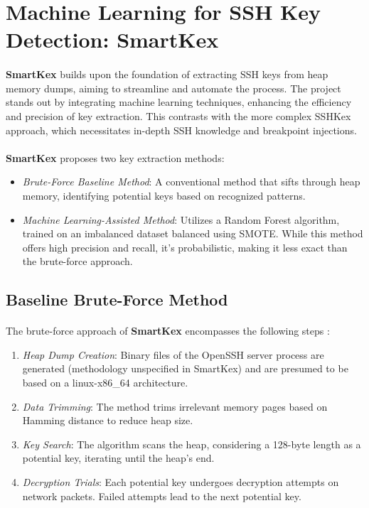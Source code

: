\section{Machine Learning for SSH Key Detection: SmartKex}

    \paragraph{}\textbf{SmartKex} builds upon the foundation of extracting SSH keys from heap memory dumps, aiming to streamline and automate the process. The project stands out by integrating machine learning techniques, enhancing the efficiency and precision of key extraction. This contrasts with the more complex SSHKex approach, which necessitates in-depth SSH knowledge and breakpoint injections.

    \paragraph{}\textbf{SmartKex} proposes two key extraction methods:
    \begin{itemize}
        \item \textit{Brute-Force Baseline Method}: A conventional method that sifts through heap memory, identifying potential keys based on recognized patterns.
        \item \textit{Machine Learning-Assisted Method}: Utilizes a Random Forest algorithm, trained on an imbalanced dataset balanced using SMOTE. While this method offers high precision and recall, it's probabilistic, making it less exact than the brute-force approach.
    \end{itemize}

    \subsection{Baseline Brute-Force Method}

    \paragraph{}The brute-force approach of \textbf{SmartKex} encompasses the following steps \cite{fellicious_smartkex_2022}:
    \begin{enumerate}
        \item \textit{Heap Dump Creation}: Binary files of the OpenSSH server process are generated (methodology unspecified in SmartKex) and are presumed to be based on a linux-x86\_64 architecture.
        \item \textit{Data Trimming}: The method trims irrelevant memory pages based on Hamming distance to reduce heap size.
        \item \textit{Key Search}: The algorithm scans the heap, considering a 128-byte length as a potential key, iterating until the heap's end.
        \item \textit{Decryption Trials}: Each potential key undergoes decryption attempts on network packets. Failed attempts lead to the next potential key.
    \end{enumerate}
